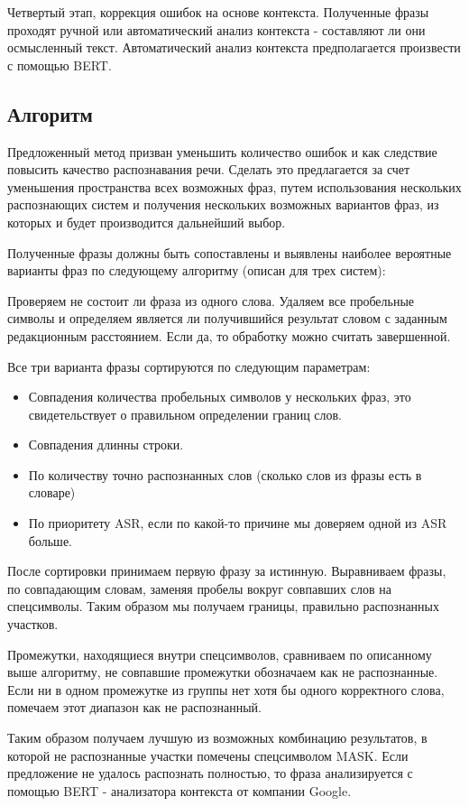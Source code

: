\documentclass[conference]{IEEEtran}
\begin{document}
Четвертый этап, коррекция ошибок на основе контекста. Полученные фразы проходят ручной или автоматический анализ контекста - составляют ли они осмысленный текст. Автоматический анализ контекста предполагается произвести с помощью BERT.

\subsection{Алгоритм}
Предложенный метод призван уменьшить количество ошибок и как следствие повысить качество распознавания речи. Сделать это предлагается за счет уменьшения пространства всех возможных фраз, путем использования нескольких распознающих систем и получения нескольких возможных вариантов фраз, из которых и будет производится дальнейший выбор.

Полученные фразы должны быть сопоставлены и выявлены наиболее вероятные варианты фраз по следующему алгоритму (описан для трех систем):

Проверяем не состоит ли фраза из одного слова. Удаляем все пробельные символы и определяем является ли получившийся результат словом с заданным редакционным расстоянием. Если да, то обработку можно считать завершенной.

Все три варианта фразы сортируются по следующим параметрам:

\begin{itemize}
\item Совпадения количества пробельных символов у нескольких фраз, это свидетельствует о правильном определении границ слов.
\item Совпадения длинны строки.
\item По количеству точно распознанных слов (сколько слов из фразы есть в словаре)
\item По приоритету ASR, если по какой-то причине мы доверяем одной из ASR больше.
\end{itemize}

После сортировки принимаем первую фразу за истинную. Выравниваем фразы, по совпадающим словам, заменяя пробелы вокруг совпавших слов на спецсимволы. Таким образом мы получаем границы, правильно распознанных участков.

Промежутки, находящиеся внутри спецсимволов, сравниваем по описанному выше алгоритму, не совпавшие промежутки обозначаем как не распознанные. Если ни в одном промежутке из группы нет хотя бы одного корректного слова, помечаем этот диапазон как не распознанный.

Таким образом получаем лучшую из возможных комбинацию результатов, в которой не распознанные участки помечены спецсимволом MASK. Если предложение не удалось распознать полностью, то фраза анализируется с помощью BERT - анализатора контекста от компании Google.
\end{document}
